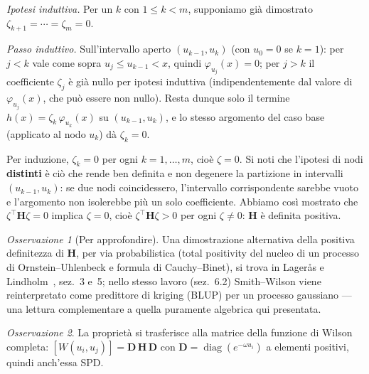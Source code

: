 \documentclass[11pt,a4paper]{article}
\theoremstyle{plain}
\theoremstyle{definition}
\theoremstyle{remark}
\newtheorem*{osservazione}{Osservazione}
\newcommand{\Hmat}{\mathbf{H}}
\newcommand{\transp}{^{\!\top}}
\begin{document}
\emph{Ipotesi induttiva.} Per un $k$ con $1\le k<m$, supponiamo gi\`a dimostrato
$\zeta_{k+1}=\cdots=\zeta_m=0$.

\emph{Passo induttivo.} Sull'intervallo aperto $(u_{k-1},u_k)$ (con $u_0=0$ se $k=1$): per
$j<k$ vale come sopra $u_j\le u_{k-1}<x$, quindi $\varphi_{u_j}(x)=0$; per $j>k$ il
coefficiente $\zeta_j$ \`e gi\`a nullo per ipotesi induttiva (indipendentemente dal valore di
$\varphi_{u_j}(x)$, che pu\`o essere non nullo). Resta dunque solo il termine
$h(x)=\zeta_k\,\varphi_{u_k}(x)$ su $(u_{k-1},u_k)$, e lo stesso argomento del caso base
(applicato al nodo $u_k$) d\`a $\zeta_k=0$.

Per induzione, $\zeta_k=0$ per ogni $k=1,\ldots,m$, cio\`e $\zeta=0$. Si noti che l'ipotesi di
nodi \textbf{distinti} \`e ci\`o che rende ben definita e non degenere la partizione in
intervalli $(u_{k-1},u_k)$: se due nodi coincidessero, l'intervallo corrispondente sarebbe
vuoto e l'argomento non isolerebbe pi\`u un solo coefficiente. Abbiamo cos\`i mostrato che
$\zeta\transp\Hmat\zeta=0$ implica $\zeta=0$, cio\`e $\zeta\transp\Hmat\zeta>0$ per ogni
$\zeta\neq 0$: $\Hmat$ \`e definita positiva.

\begin{osservazione}[Per approfondire]
Una dimostrazione alternativa della positiva definitezza di $\Hmat$, per via probabilistica
(total positivity del nucleo di un processo di Ornstein--Uhlenbeck e formula di
Cauchy--Binet), si trova in Lager\aa s e Lindholm~\cite{lageras2016}, sez.~3 e~5; nello stesso
lavoro (sez.~6.2) Smith--Wilson viene reinterpretato come predittore di kriging (BLUP) per un
processo gaussiano --- una lettura complementare a quella puramente algebrica qui presentata.
\end{osservazione}

\begin{osservazione}
La propriet\`a si trasferisce alla matrice della funzione di Wilson completa:
$[W(u_i,u_j)] = \mathbf{D}\,\Hmat\,\mathbf{D}$ con
$\mathbf{D}=\operatorname{diag}(e^{-\omega u_i})$ a elementi positivi, quindi anch'essa SPD.
\end{osservazione}
\end{document}
